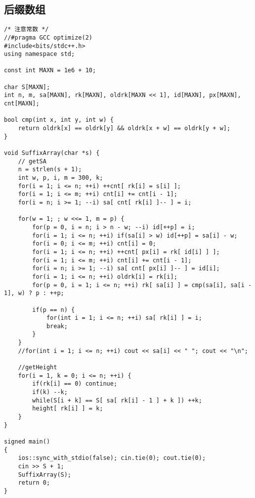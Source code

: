 \subsection{后缀数组}
\begin{lstlisting}
/* 注意常数 */
//#pragma GCC optimize(2)
#include<bits/stdc++.h>
using namespace std;

const int MAXN = 1e6 + 10;

char S[MAXN];
int n, m, sa[MAXN], rk[MAXN], oldrk[MAXN << 1], id[MAXN], px[MAXN], cnt[MAXN]; 

bool cmp(int x, int y, int w) {
	return oldrk[x] == oldrk[y] && oldrk[x + w] == oldrk[y + w];
}

void SuffixArray(char *s) {
	// getSA	
	n = strlen(s + 1);
	int w, p, i, m = 300, k;
	for(i = 1; i <= n; ++i) ++cnt[ rk[i] = s[i] ];
	for(i = 1; i <= m; ++i) cnt[i] += cnt[i - 1];
	for(i = n; i >= 1; --i) sa[ cnt[ rk[i] ]-- ] = i;
	
	for(w = 1; ; w <<= 1, m = p) {
		for(p = 0, i = n; i > n - w; --i) id[++p] = i;
		for(i = 1; i <= n; ++i) if(sa[i] > w) id[++p] = sa[i] - w;
		for(i = 0; i <= m; ++i) cnt[i] = 0;
		for(i = 1; i <= n; ++i) ++cnt[ px[i] = rk[ id[i] ] ];
		for(i = 1; i <= m; ++i) cnt[i] += cnt[i - 1];
		for(i = n; i >= 1; --i) sa[ cnt[ px[i] ]-- ] = id[i];
		for(i = 1; i <= n; ++i) oldrk[i] = rk[i];
		for(p = 0, i = 1; i <= n; ++i) rk[ sa[i] ] = cmp(sa[i], sa[i - 1], w) ? p : ++p;
	
		if(p == n) {
			for(int i = 1; i <= n; ++i) sa[ rk[i] ] = i;	
			break;
		}
	}
	//for(int i = 1; i <= n; ++i) cout << sa[i] << " "; cout << "\n";
	
	//getHeight
	for(i = 1, k = 0; i <= n; ++i) {
		if(rk[i] == 0) continue;
		if(k) --k;
		while(S[i + k] == S[ sa[ rk[i] - 1 ] + k ]) ++k;
		height[ rk[i] ] = k;
	}
}

signed main()
{
	ios::sync_with_stdio(false); cin.tie(0); cout.tie(0);
	cin >> S + 1;
	SuffixArray(S);
	return 0;
}

\end{lstlisting}

